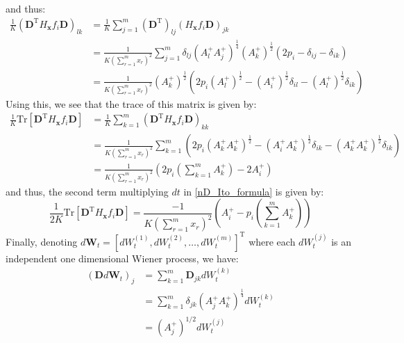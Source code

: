 and thus:
\begin{align}
\frac{1}{K}\left(\mathbf{D}^{\mathrm{T}} H_{\mathbf{x}} f_i \mathbf{D}\right)_{lk} &=\frac{1}{K}\sum\limits_{j=1}^{m}\left(\mathbf{D}^{\mathrm{T}}\right)_{lj}\left(H_{\mathbf{x}} f_i \mathbf{D}\right)_{jk}\nonumber\\
&=  \frac{1}{K\left(\sum\limits_{r=1}^{m}x_r\right)^2}\sum\limits_{j=1}^{m}\delta_{lj}\left(A^{+}_{l}A^{+}_{j}\right)^{\frac{1}{4}}(A^{+}_{k})^{\frac{1}{2}}\left(2p_i -\delta_{ij} -\delta_{ik}\right)\\
&=  \frac{1}{K\left(\sum\limits_{r=1}^{m}x_r\right)^2}(A^{+}_{k})^{\frac{1}{2}}\left(2p_i(A^{+}_{l})^{\frac{1}{2}} - (A^{+}_{i})^{\frac{1}{2}}\delta_{il} - (A^{+}_{l})^{\frac{1}{2}}\delta_{ik}\right)
\end{align}
Using this, we see that the trace of this matrix is given by:
\begin{align}
\frac{1}{K}\mathrm{Tr}[\mathbf{D}^{\mathrm{T}} H_{\mathbf{x}} f_i \mathbf{D}] &= \frac{1}{K}\sum\limits_{k=1}^{m}\left(\mathbf{D}^{\mathrm{T}} H_{\mathbf{x}} f_i \mathbf{D}\right)_{kk}\nonumber\\
&= \frac{1}{K\left(\sum\limits_{r=1}^{m}x_r\right)^2}\sum\limits_{k=1}^{m}\left(2p_i(A^{+}_{k}A^{+}_{k})^{\frac{1}{2}} - (A^{+}_{i}A^{+}_{k})^{\frac{1}{2}}\delta_{ik} - (A^{+}_{k}A^{+}_{k})^{\frac{1}{2}}\delta_{ik}\right)\\
&= \frac{1}{K\left(\sum\limits_{r=1}^{m}x_r\right)^2}\left(2p_i\left(\sum\limits_{k=1}^{m} A^{+}_k\right) - 2A^{+}_{i}\right)
\end{align}
and thus, the second term multiplying $dt$ in \eqref{nD_Ito_formula} is given by:
\begin{equation}
\frac{1}{2K}\mathrm{Tr}[\mathbf{D}^{\mathrm{T}} H_{\mathbf{x}} f_i \mathbf{D}] =  \frac{-1}{K\left(\sum\limits_{r=1}^{m}x_r\right)^2}\left(A^{+}_{i}-p_i\left(\sum\limits_{k=1}^{m} A^{+}_k\right)\right)\label{nD_for_Ito_second_term}
\end{equation}
Finally, denoting $d\mathbf{W}_t = [dW^{(1)}_t,dW^{(2)}_t, \ldots, dW^{(m)}_t]^{\mathrm{T}}$ where each $dW^{(j)}_t$ is an independent one dimensional Wiener process, we have:
\begin{align}
\left(\mathbf{D}d\mathbf{W}_t\right)_j &= \sum\limits_{k=1}^{m}\mathbf{D}_{jk}dW^{(k)}_t\nonumber\\
&= \sum\limits_{k=1}^{m}\delta_{jk}\left(A^{+}_{j}A^{+}_{k}\right)^{\frac{1}{4}}dW^{(k)}_t\\
&= \left(A^{+}_{j}\right)^{1/2}dW^{(j)}_t
\end{align}
